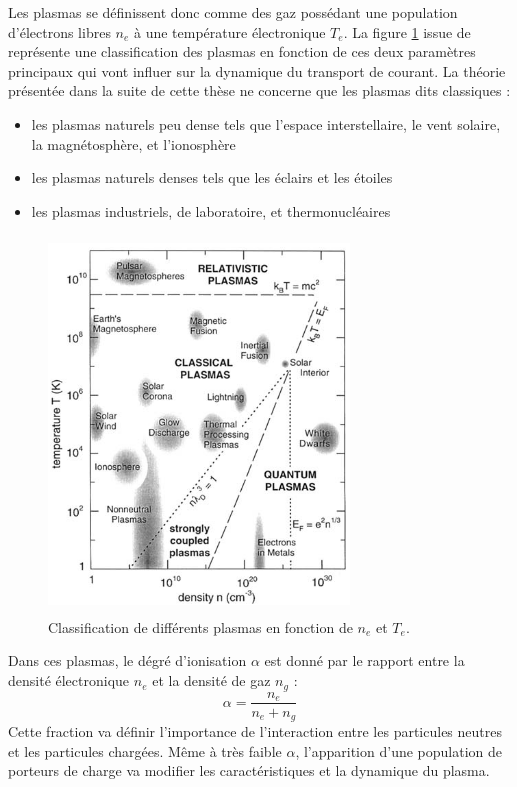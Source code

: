 			Les plasmas se définissent donc comme des gaz possédant une population
			d'électrons libres $n_e$ à une température électronique $T_e$. 
			La figure \ref{zoologie} issue de \cite{national1995Plasma}
			représente une classification des plasmas en fonction de ces deux paramètres 
			principaux qui vont influer sur la dynamique du transport de courant.
			La théorie présentée dans la suite de cette thèse ne concerne que les plasmas
			dits classiques :
			\begin{itemize}
			  \item les plasmas naturels peu dense tels que l'espace interstellaire,
			  le vent solaire, la magnétosphère, et l'ionosphère
			  \item les plasmas naturels denses tels que les éclairs et les étoiles
			  \item les plasmas industriels, de laboratoire, et thermonucléaires
			\end{itemize}
			\begin{figure}[h]
				\centering
				\includegraphics[height=100mm,width=80mm]{figures/zoologie.png}{\caption{Classification
				de différents plasmas en fonction de $n_e$ et $T_e$.}\label{zoologie}}
			\end{figure}
			
			Dans ces plasmas, le dégré d'ionisation $\alpha$ est donné par le rapport
			entre la densité électronique $n_e$ et la densité de gaz $n_g$ :
				$$\alpha=\frac{n_e}{n_e+n_g}$$
			Cette fraction va définir l'importance de l'interaction entre les particules 
			neutres et les particules chargées. Même à très faible $\alpha$, l'apparition
			d'une population de porteurs de charge va modifier les caractéristiques et la
			dynamique du plasma. 
			
